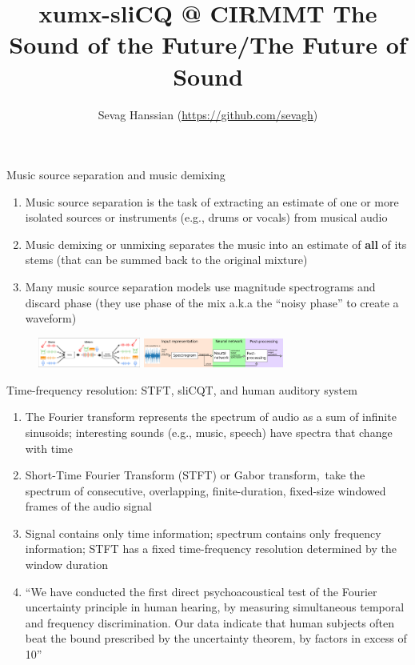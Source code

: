 \documentclass[final]{beamer}
\title{xumx-sliCQ @ CIRMMT The Sound of the Future/The Future of Sound}
\author{Sevag Hanssian (\url{https://github.com/sevagh})}
\institute{McGill University}
\begin{document}
  \begin{frame}{} 
	\begin{block}{Music source separation and music demixing}
		\begin{enumerate}
			\item
				Music source separation is the task of extracting an estimate of one or more isolated sources or instruments (e.g., drums or vocals) from musical audio
			\item
				Music demixing or unmixing separates the music into an estimate of \textbf{all} of its stems (that can be summed back to the original mixture)
		  \item
			  Many music source separation models use magnitude spectrograms and discard phase (they use phase of the mix a.k.a the ``noisy phase'' to create a waveform)
		\end{enumerate}
	\end{block}
	  \begin{figure}
		  \centering
		  \includegraphics[width=0.3\textwidth]{./images-mss/mixdemix.png}
		  \hspace{1em}
		  \includegraphics[width=0.41\textwidth]{./images-blockdiagrams/generic_mdx.png}
	  \end{figure}
	\begin{block}{Time-frequency resolution: STFT, sliCQT, and human auditory system}
	  \begin{enumerate}
		  \item
			  The Fourier transform represents the spectrum of audio as a sum of infinite sinusoids; interesting sounds (e.g., music, speech) have spectra that change with time
		  \item
			  Short-Time Fourier Transform (STFT) or Gabor transform,\footnotemark\ take the spectrum of consecutive, overlapping, finite-duration, fixed-size windowed frames of the audio signal
		  \item
			  Signal contains only time information; spectrum contains only frequency information; STFT has a fixed time-frequency resolution determined by the window duration
		  \item
			``We have conducted the first direct psychoacoustical test of the Fourier uncertainty principle in human hearing, by measuring simultaneous temporal and frequency discrimination. Our data indicate that human subjects often beat the bound prescribed by the uncertainty theorem, by factors in excess of 10''\footnotemark

\end{enumerate}
\end{block}
\end{frame}
\end{document}
